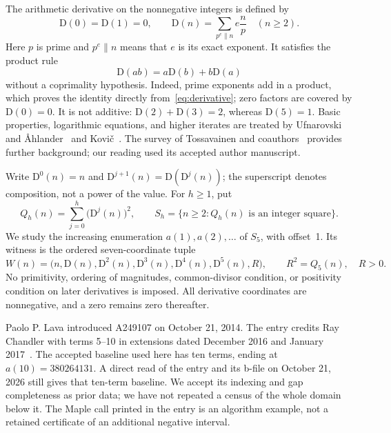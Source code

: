 \documentclass[11pt,a4paper]{article}
\newcommand{\D}{\mathrm{D}}
\theoremstyle{definition}
\theoremstyle{remark}
\begin{document}
The arithmetic derivative on the nonnegative integers is defined by
\begin{equation}\label{eq:derivative}
 \D(0)=\D(1)=0,\qquad
 \D(n)=\sum_{p^e\parallel n}e\frac{n}{p}\quad(n\ge2).
\end{equation}
Here $p$ is prime and $p^e\parallel n$ means that $e$ is its exact exponent.
It satisfies the product rule
\begin{equation}\label{eq:product}
 \D(ab)=a\D(b)+b\D(a)
\end{equation}
without a coprimality hypothesis. Indeed, prime exponents add in a product,
which proves the identity directly from~\eqref{eq:derivative}; zero factors
are covered by $\D(0)=0$. It is not additive: $\D(2)+\D(3)=2$, whereas
$\D(5)=1$. Basic properties, logarithmic equations, and higher iterates are
treated by Ufnarovski and \AA hlander~\cite{ufnarovski} and Kovi\v{c}~\cite{kovic}.
The survey of Tossavainen and coauthors~\cite{overview} provides further
background; our reading used its accepted author manuscript.

Write $\D^0(n)=n$ and $\D^{j+1}(n)=\D(\D^j(n))$; the superscript denotes
composition, not a power of the value. For $h\ge1$, put
\begin{equation}\label{eq:Qh}
 Q_h(n)=\sum_{j=0}^{h}\bigl(\D^j(n)\bigr)^2,
 \qquad S_h=\{n\ge2:Q_h(n)\text{ is an integer square}\}.
\end{equation}
We study the increasing enumeration $a(1),a(2),\ldots$ of $S_5$,
with offset~1. Its witness is the ordered seven-coordinate tuple
\begin{equation}\label{eq:witness}
 W(n)=\bigl(n,\D(n),\D^2(n),\D^3(n),\D^4(n),\D^5(n),R\bigr),
 \qquad R^2=Q_5(n),\quad R>0.
\end{equation}
No primitivity, ordering of magnitudes, common-divisor condition, or
positivity condition on later derivatives is imposed. All derivative
coordinates are nonnegative, and a zero remains zero thereafter.

Paolo P. Lava introduced A249107 on October 21, 2014. The entry credits Ray
Chandler with terms 5--10 in extensions dated December 2016 and January
2017~\cite{sequence}. The accepted baseline used here has ten terms, ending
at $a(10)=380264131$. A direct read of the entry and its b-file on
October 21, 2026 still gives that ten-term baseline. We accept its indexing
and gap completeness as prior data; we have not repeated a census of the
whole domain below it. The Maple call printed in the entry is an algorithm
example, not a retained certificate of an additional negative interval.
\end{document}
